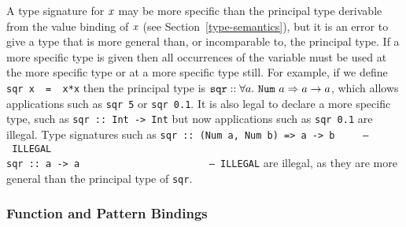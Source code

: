 A type signature for \mbox{$\it x$} may be more specific than the principal
type derivable from the value binding of \mbox{$\it x$} (see
Section~\ref{type-semantics}), but it is an error to give a type
that is more
general than, or incomparable to, the principal type.
If a more specific type is given then all occurrences of the
variable must be used at the more specific type or at a more
specific type still.
%
For example, if we define\nopagebreak[4]
\bprog
\mbox{\tt sqr\ x\ \ =\ \ x*x}
\eprog
then the principal type is 
$\mbox{\tt sqr} :: \forall a.~ \mbox{\tt Num}~ a \Rightarrow a \rightarrow a$, 
which allows
applications such as \mbox{\tt sqr\ 5} or \mbox{\tt sqr\ 0.1}.  It is also legal to declare
a more specific type, such as
\bprog
\mbox{\tt sqr\ ::\ Int\ ->\ Int}
\eprog
but now applications such as \mbox{\tt sqr\ 0.1} are illegal.  Type signatures such as
\bprog
\mbox{\tt sqr\ ::\ (Num\ a,\ Num\ b)\ =>\ a\ ->\ b\ \ \ \ \ --\ ILLEGAL}\\
\mbox{\tt sqr\ ::\ a\ ->\ a\ \ \ \ \ \ \ \ \ \ \ \ \ \ \ \ \ \ \ \ \ \ \ --\ ILLEGAL}
\eprog
are illegal, as they are more general than the principal type of \mbox{\tt sqr}.

\subsubsection{Function and Pattern Bindings}
\label{function-bindings}\label{pattern-bindings}

